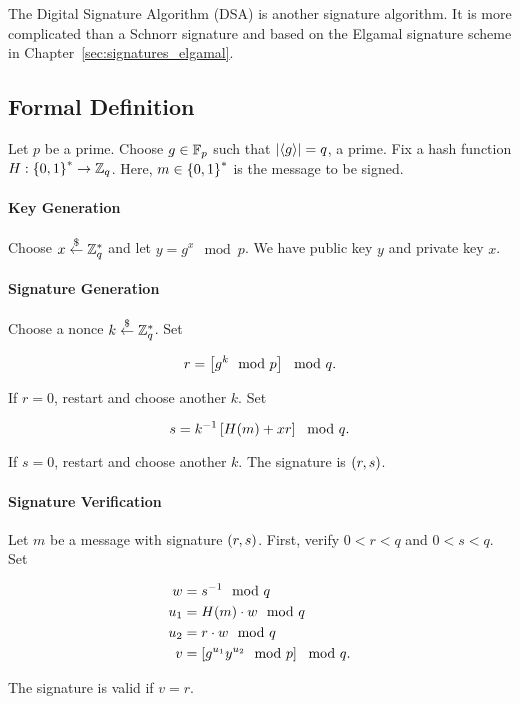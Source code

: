 The Digital Signature Algorithm (DSA) is another signature
algorithm.
It is more complicated than a Schnorr signature and based
on the Elgamal signature scheme in Chapter~\ref{sec:signatures_elgamal}.

\subsection{Formal Definition}

\begin{defn}
\label{def:dsa}
Let $p$ be a prime.
Choose $g\in\mathbb{F}_{p}$ such that $\left| \left\langle g \right\rangle \right| = q$, a prime.
Fix a \gls{hash function} $H:\left\{ 0,1 \right\}^{*}\to\mathbb{Z}_{q}$.
Here, $m\in\left\{ 0,1 \right\}^{*}$ is the message to be signed.

\paragraph{Key Generation}
Choose $x\stackrel{\$}{\leftarrow}{}\mathbb{Z}_{q}^{*}$ and let $y = g^{x}\mod p$.
We have public key $y$ and private key $x$.

\paragraph{Signature Generation}
Choose a \gls{nonce} $k\stackrel{\$}{\leftarrow}{}\mathbb{Z}_{q}^{*}$.
Set

\begin{equation}
    r = \left[ g^{k}\mod p \right] \mod q.
\end{equation}

\noindent
If $r = 0$, restart and choose another $k$.
Set

\begin{equation}
    s = k^{-1}\left[ H(m) + xr \right] \mod q.
\end{equation}

\noindent
If $s = 0$, restart and choose another $k$.
The signature is $\left( r,s \right)$.

\paragraph{Signature Verification}
Let $m$ be a message with signature $\left( r,s \right)$.
First, verify $0<r<q$ and $0<s<q$.
Set

\begin{align}
    w &= s^{-1} \mod q \nonumber\\
    u_{1} &= H(m)\cdot w \mod q \nonumber\\
    u_{2} &= r\cdot w \mod q \nonumber\\
    v &= \left[ g^{u_{1}}y^{u_{2}} \mod p \right] \mod q.
\end{align}

\noindent
The signature is valid if $v = r$.
\end{defn}

